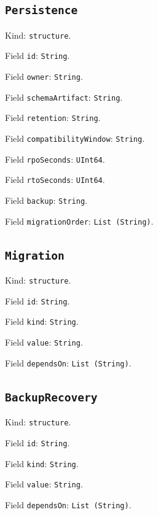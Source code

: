 \documentclass[11pt]{article}
\begin{document}
\subsection*{\texttt{Persistence}}
\noindent Kind: \texttt{structure}.\par
\noindent Field \texttt{id}: \texttt{String}.\par
\noindent Field \texttt{owner}: \texttt{String}.\par
\noindent Field \texttt{schemaArtifact}: \texttt{String}.\par
\noindent Field \texttt{retention}: \texttt{String}.\par
\noindent Field \texttt{compatibilityWindow}: \texttt{String}.\par
\noindent Field \texttt{rpoSeconds}: \texttt{UInt64}.\par
\noindent Field \texttt{rtoSeconds}: \texttt{UInt64}.\par
\noindent Field \texttt{backup}: \texttt{String}.\par
\noindent Field \texttt{migrationOrder}: \texttt{List (String)}.\par
\subsection*{\texttt{Migration}}
\noindent Kind: \texttt{structure}.\par
\noindent Field \texttt{id}: \texttt{String}.\par
\noindent Field \texttt{kind}: \texttt{String}.\par
\noindent Field \texttt{value}: \texttt{String}.\par
\noindent Field \texttt{dependsOn}: \texttt{List (String)}.\par
\subsection*{\texttt{BackupRecovery}}
\noindent Kind: \texttt{structure}.\par
\noindent Field \texttt{id}: \texttt{String}.\par
\noindent Field \texttt{kind}: \texttt{String}.\par
\noindent Field \texttt{value}: \texttt{String}.\par
\noindent Field \texttt{dependsOn}: \texttt{List (String)}.\par
\end{document}
